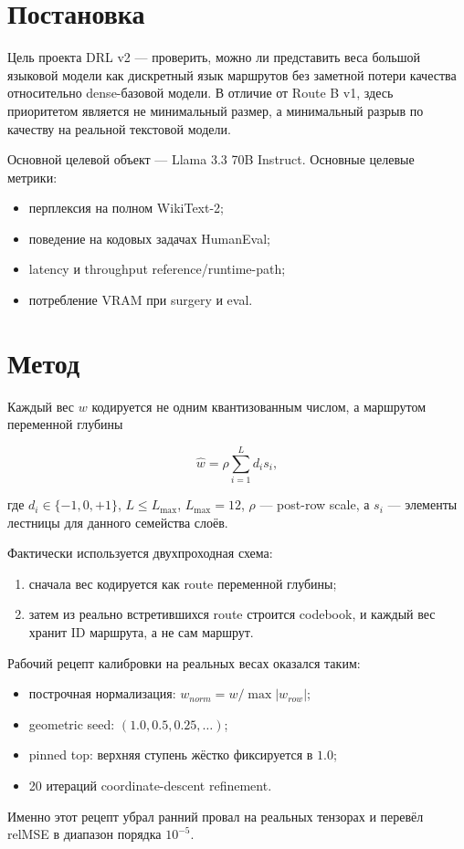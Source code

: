 \section{Постановка}

Цель проекта DRL v2 --- проверить, можно ли представить веса большой языковой
модели как дискретный язык маршрутов без заметной потери качества относительно
dense-базовой модели. В отличие от Route B v1, здесь приоритетом является не
минимальный размер, а минимальный разрыв по качеству на реальной текстовой модели.

Основной целевой объект --- Llama 3.3 70B Instruct. Основные целевые метрики:

\begin{itemize}[leftmargin=1.5em]
\item перплексия на полном WikiText-2;
\item поведение на кодовых задачах HumanEval;
\item latency и throughput reference/runtime-path;
\item потребление VRAM при surgery и eval.
\end{itemize}

\section{Метод}

Каждый вес $w$ кодируется не одним квантизованным числом, а маршрутом
переменной глубины

$$
\hat{w} = \rho \sum_{i=1}^{L} d_i s_i,
$$

где $d_i \in \{-1,0,+1\}$, $L \leq L_{\max}$, $L_{\max}=12$, $\rho$ ---
post-row scale, а $s_i$ --- элементы лестницы для данного семейства слоёв.

Фактически используется двухпроходная схема:

\begin{enumerate}[leftmargin=1.7em]
\item сначала вес кодируется как route переменной глубины;
\item затем из реально встретившихся route строится codebook, и каждый вес хранит
ID маршрута, а не сам маршрут.
\end{enumerate}

Рабочий рецепт калибровки на реальных весах оказался таким:

\begin{itemize}[leftmargin=1.5em]
\item построчная нормализация: $w_{norm} = w / \max |w_{row}|$;
\item geometric seed: $(1.0, 0.5, 0.25, \dots)$;
\item pinned top: верхняя ступень жёстко фиксируется в $1.0$;
\item 20 итераций coordinate-descent refinement.
\end{itemize}

Именно этот рецепт убрал ранний провал на реальных тензорах и перевёл relMSE в
диапазон порядка $10^{-5}$.